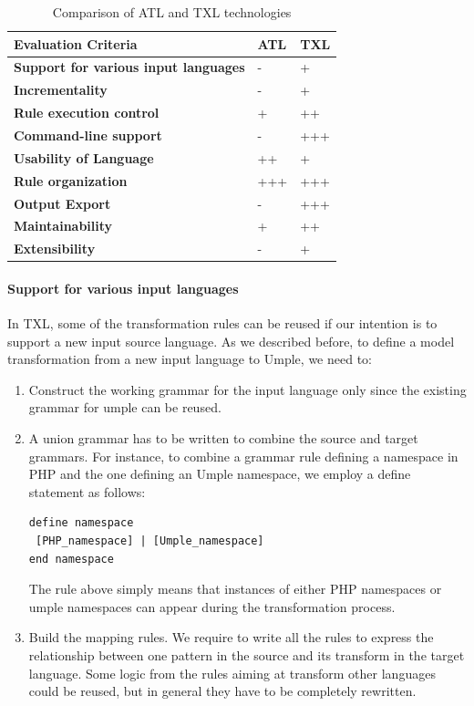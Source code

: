 \begin{table}[h]
\caption{Comparison of ATL and TXL technologies}
\label{table:comparisonATLTXL}
\begin{tabularx}{\textwidth}{X|Y|Y}
\toprule
{}
\textbf{Evaluation Criteria} & \textbf{ATL}  & \textbf{TXL}   \\ \hline
\textbf{Support for various input languages} & - &  +  \\ \hline
\textbf{Incrementality} & - &  +  \\ \hline
\textbf{Rule execution control} & + &   ++ \\ \hline
\textbf{Command-line support} & - & +++	    \\ \hline
\textbf{Usability of Language} & ++  & +   \\ \hline
\textbf{Rule organization} & +++ &  +++  \\ \hline
\textbf{Output Export} & - &  +++  \\ \hline
\textbf{Maintainability} & + &  ++  \\ \hline
\textbf{Extensibility} & - &  +  \\ \hline
\end{tabularx}
\end{table}

\paragraph*{Support for various input languages}

In TXL, some of the transformation rules can be reused if our intention is to support a new input source language.  As we described before, to define a model transformation from a new  input language to Umple, we need to:

\begin{enumerate}
\item Construct the working grammar for the input language only since the existing grammar for umple can be reused. 
\item A union grammar has to be written to combine the source and target grammars. For instance, to combine a grammar rule defining a namespace in PHP and the one defining an Umple namespace, we employ a define statement as follows:

\begin{lstlisting}[style=umplePlain] 
define namespace
 [PHP_namespace] | [Umple_namespace]
end namespace
\end{lstlisting}
The rule above simply means that instances of either PHP namespaces or umple namespaces can appear during the transformation process. 
\item Build the mapping rules. We require to write all the rules to express the relationship between one pattern in the source  and its transform in the target language. Some logic from the rules aiming at transform other languages could be reused, but in general they have to be completely rewritten. 
\end{enumerate}

